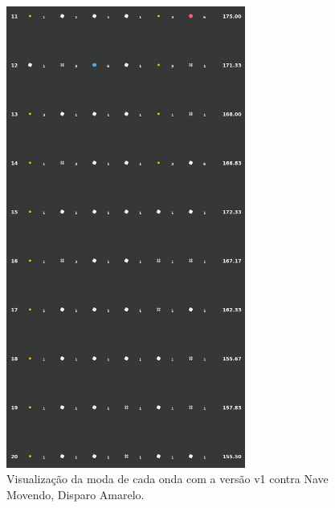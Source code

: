 \begin{figure}[H]
  \centering
  \includegraphics[width=0.7\textwidth]{figuras/ss/ss_yellowstill_ai_mode_1_2.png}
  \caption{Visualização da moda de cada onda com a versão v1 contra Nave Movendo, Disparo Amarelo.}
  \label{fig:ss-moda-ym-1-2}
\end{figure}

